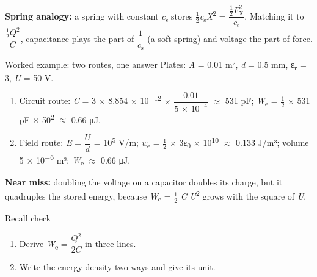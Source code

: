 \documentclass[11pt]{article}
\begin{document}
\begin{keepsection}
\textbf{Spring analogy:} a spring with constant \textit{c}\textsubscript{s} stores \ensuremath{\tfrac12}\textit{c}\textsubscript{s}\textit{X}\textsuperscript{2} = {\small\ensuremath{\dfrac{\tfrac{1}{2}{F}_{\mathrm{X}}^{2}}{{c}_{\mathrm{s}}}}}. Matching it to {\small\ensuremath{\dfrac{\tfrac{1}{2}{Q}^{2}}{{C}}}}, capacitance plays the part of {\small\ensuremath{\dfrac{1}{{c}_{\mathrm{s}}}}} (a soft spring) and voltage the part of force.

\begin{workedbox}{Worked example: two routes, one answer}
Plates: \textit{A} = 0.01 m², \textit{d} = 0.5 mm, ε\textsubscript{r} = 3, \textit{U} = 50 V.

\begin{enumerate}
\item Circuit route: \textit{C} = 3 \ensuremath{\times} 8.854 \ensuremath{\times} 10\textsuperscript{\ensuremath{-}12} \ensuremath{\times} {\small\ensuremath{\dfrac{0.01}{5\, \times \, 10^{-4}}}} \ensuremath{\approx} 531 pF; \textit{W}\textsubscript{e} = \ensuremath{\tfrac12} \ensuremath{\times} 531 pF \ensuremath{\times} 50\textsuperscript{2} \ensuremath{\approx} 0.66 μJ.
\item Field route: \textit{E} = {\small\ensuremath{\dfrac{{U}}{{d}}}} = 10\textsuperscript{5} V/m; \textit{w}\textsubscript{e} = \ensuremath{\tfrac12} \ensuremath{\times} 3ε\textsubscript{0} \ensuremath{\times} 10\textsuperscript{10} \ensuremath{\approx} 0.133 J/m³; volume 5 \ensuremath{\times} 10\textsuperscript{\ensuremath{-}6} m³; \textit{W}\textsubscript{e} \ensuremath{\approx} 0.66 μJ.
\end{enumerate}
\end{workedbox}

\begin{notebox}\textbf{Near miss:} doubling the voltage on a capacitor doubles its charge, but it quadruples the stored energy, because \textit{W}\textsubscript{e} = \ensuremath{\tfrac12} \textit{C} \textit{U}\textsuperscript{2} grows with the square of \textit{U}.\end{notebox}

\begin{recallbox}{Recall check}
\begin{enumerate}
\item Derive \textit{W}\textsubscript{e} = {\small\ensuremath{\dfrac{{Q}^{2}}{2{C}}}} in three lines.
\item Write the energy density two ways and give its unit.
\end{enumerate}

\end{recallbox}
\end{keepsection}
\end{document}
